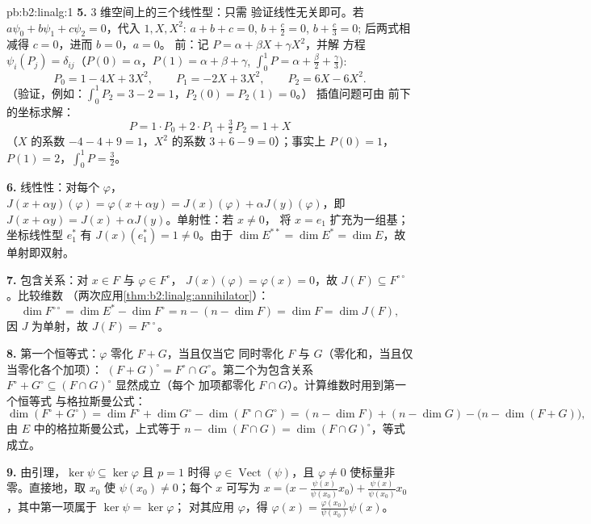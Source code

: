 \begin{solution}{pb:b2:linalg:1}
\textbf{5.} $3$ 维空间上的三个线性型：只需
验证线性无关即可。若 $a\psi_0 + b\psi_1 + c\psi_2 = 0$，代入 $1, X,
X^2$: $a + b + c = 0$, $b + \frac c2 = 0$, $b + \frac c3 = 0$;
后两式相减得 $c = 0$，进而 $b = 0$，$a = 0$。
前：记 $P = \alpha + \beta X + \gamma X^2$，并解
方程 $\psi_i(P_j) = \delta_{ij}$（$P(0) = \alpha$，$P(1) =
\alpha + \beta + \gamma$, $\int_0^1 P = \alpha + \frac\beta2 +
\frac\gamma3$):
\[
P_0 = 1 - 4X + 3X^2, \qquad
P_1 = -2X + 3X^2, \qquad
P_2 = 6X - 6X^2 .
\]
（验证，例如：$\int_0^1 P_2 = 3 - 2 = 1$，$P_2(0) = P_2(1) = 0$。）
插值问题可由
前下的坐标求解：
\[
P = 1\cdot P_0 + 2\cdot P_1 + \tfrac32\, P_2 = 1 + X
\]
（$X$ 的系数 $-4 - 4 + 9 = 1$，$X^2$ 的系数 $3 + 6 - 9 =
0$）；事实上 $P(0) = 1$，$P(1) = 2$，$\int_0^1 P = \frac32$。

\textbf{6.} 线性性：对每个 $\varphi$，$J(x + \alpha
y)(\varphi) = \varphi(x + \alpha y) = J(x)(\varphi) + \alpha
J(y)(\varphi)$，即 $J(x + \alpha y) = J(x) + \alpha J(y)$。单射性：若 $x \neq 0$，
将 $x = e_1$ 扩充为一组基；坐标线性型 $e_1^*$ 有
$J(x)(e_1^*) = 1 \neq 0$。由于 $\dim E^{**} = \dim E^* = \dim
E$，故单射即双射。

\textbf{7.} 包含关系：对 $x \in F$ 与 $\varphi \in F^\circ$，
$J(x)(\varphi) = \varphi(x) = 0$，故 $J(F) \subseteq
F^{\circ\circ}$。比较维数
（两次应用\cref{thm:b2:linalg:annihilator}）：
\[
\dim F^{\circ\circ} = \dim E^* - \dim F^\circ
= n - (n - \dim F) = \dim F = \dim J(F),
\]
因 $J$ 为单射，故 $J(F) = F^{\circ\circ}$。

\textbf{8.} 第一个恒等式：$\varphi$ 零化 $F + G$，当且仅当它
同时零化 $F$ 与 $G$（零化和，当且仅当零化各个加项）：
$(F+G)^\circ = F^\circ \cap G^\circ$。第二个为包含关系
$F^\circ + G^\circ \subseteq (F \cap G)^\circ$ 显然成立（每个
加项都零化 $F \cap G$）。计算维数时用到第一个恒等式
与格拉斯曼公式：
\[
\dim(F^\circ + G^\circ) = \dim F^\circ + \dim G^\circ -
\dim(F^\circ \cap G^\circ)
= (n - \dim F) + (n - \dim G) - \bigl(n - \dim(F +
G)\bigr),
\]
由 $E$ 中的格拉斯曼公式，上式等于 $n - \dim(F \cap G) = \dim(F
\cap G)^\circ$，等式成立。

\textbf{9.} 由引理，$\ker\psi \subseteq \ker\varphi$ 且
$p = 1$ 时得 $\varphi \in \operatorname{Vect}(\psi)$，且
$\varphi \neq 0$ 使标量非零。直接地，取 $x_0$
使 $\psi(x_0) \neq 0$；每个 $x$ 可写为 $x = \bigl(x -
\frac{\psi(x)}{\psi(x_0)}x_0\bigr) + \frac{\psi(x)}{\psi(x_0)}
x_0$，其中第一项属于 $\ker\psi = \ker\varphi$；
对其应用 $\varphi$，得 $\varphi(x) = \frac{\varphi(x_0)}{\psi(x_0)}\psi(x)$。


\end{solution}
